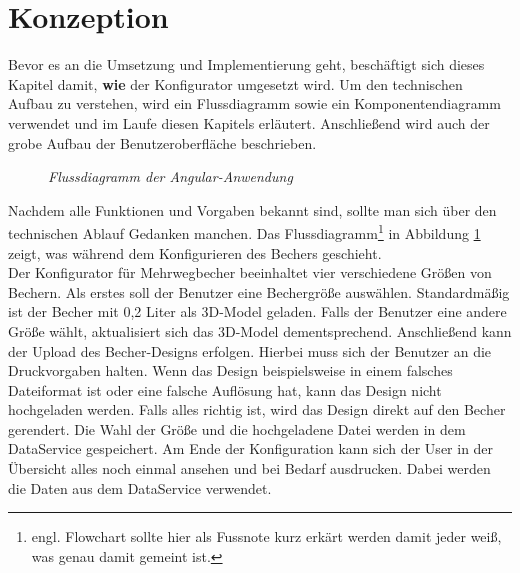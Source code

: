 \section{Konzeption}
\label{sec:konzept}
%
Bevor es an die Umsetzung und Implementierung geht, beschäftigt sich dieses Kapitel damit, \textbf{wie} der Konfigurator umgesetzt wird. Um den technischen Aufbau zu verstehen, wird ein Flussdiagramm sowie ein Komponentendiagramm verwendet und im Laufe diesen Kapitels erläutert. Anschließend wird auch der grobe Aufbau der Benutzeroberfläche beschrieben.
\begin{figure}[h]
	\centering
	{}
	\caption[Komponentendiagramm]{\textit{Flussdiagramm der Angular-Anwendung}}
	\label{fig:flowchart}
\end{figure}
 Nachdem alle Funktionen und Vorgaben bekannt sind, sollte man sich über den technischen Ablauf Gedanken manchen. Das Flussdiagramm\footnote{engl. Flowchart sollte hier als Fussnote kurz erkärt werden damit jeder weiß, was genau damit gemeint ist.} in Abbildung \ref{fig:flowchart} zeigt, was während dem Konfigurieren des Bechers geschieht.\\
 Der Konfigurator für Mehrwegbecher beeinhaltet vier verschiedene Größen von Bechern. Als erstes soll der Benutzer eine Bechergröße auswählen. Standardmäßig ist der Becher mit 0,2 Liter als 3D-Model geladen. Falls der Benutzer eine andere Größe wählt, aktualisiert sich das 3D-Model dementsprechend. Anschließend kann der Upload des Becher-Designs erfolgen. Hierbei muss sich der Benutzer an die Druckvorgaben halten. Wenn das Design beispielsweise in einem falsches Dateiformat ist oder eine falsche Auflösung hat, kann das Design nicht hochgeladen werden. Falls alles richtig ist, wird das Design direkt auf den Becher gerendert. Die Wahl der Größe und die hochgeladene Datei werden in dem DataService gespeichert. Am Ende der Konfiguration kann sich der User in der Übersicht alles noch einmal ansehen und bei Bedarf ausdrucken. Dabei werden die Daten aus dem DataService verwendet.  
 
